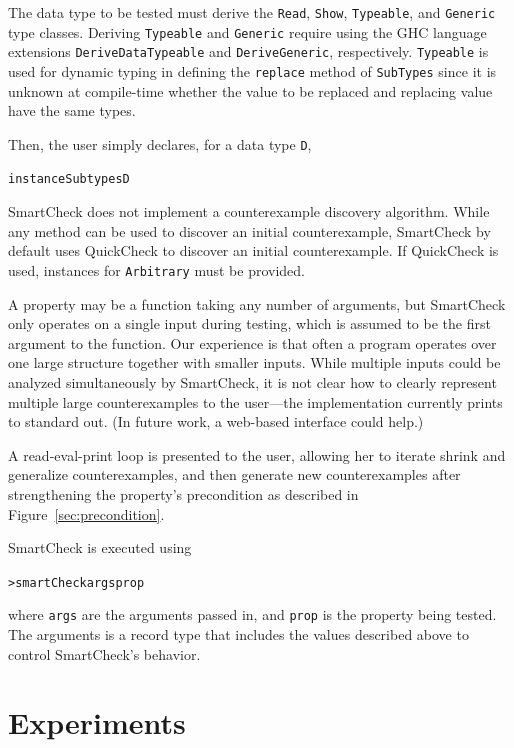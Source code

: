 \documentclass[10pt]{sigplanconf}
\newenvironment{code}{\begin{alltt}}{\end{alltt}}
\newcommand{\ttp}[1]{\texttt{#1}}
\begin{document}
The data type to be tested must derive the \ttp{Read}, \ttp{Show},
\ttp{Typeable}, and \ttp{Generic} type classes.  Deriving \ttp{Typeable} and
\ttp{Generic} require using the GHC language extensions \ttp{DeriveDataTypeable}
and \ttp{DeriveGeneric}, respectively.  \ttp{Typeable} is used for dynamic
typing in defining the \ttp{replace} method of \ttp{SubTypes} since it is
unknown at compile-time whether the value to be replaced and replacing value
have the same types.

Then, the user simply declares, for a data type \ttp{D},
%
\begin{code}
instance Subtypes D
\end{code}
%

SmartCheck does not implement a counterexample discovery algorithm.  While any
method can be used to discover an initial counterexample, SmartCheck by default
uses QuickCheck to discover an initial counterexample.  If QuickCheck is used,
instances for \ttp{Arbitrary} must be provided.

A property may be a function taking any number of arguments, but SmartCheck only
operates on a single input during testing, which is assumed to be the first
argument to the function.  Our experience is that often a program operates over
one large structure together with smaller inputs.  While multiple inputs could
be analyzed simultaneously by SmartCheck, it is not clear how to clearly
represent multiple large counterexamples to the user---the implementation
currently prints to standard out.  (In future work, a web-based interface could help.)

A read-eval-print loop is presented to the user, allowing her to iterate shrink
and generalize counterexamples, and then generate new counterexamples after
strengthening the property's precondition as described in
Figure~\ref{sec:precondition}.

SmartCheck is executed using
%
\begin{code}
> smartCheck args prop
\end{code}
%
\noindent
where \ttp{args} are the arguments passed in, and \ttp{prop} is the property
being tested.  The arguments is a record type that includes the values described
above to control SmartCheck's behavior.


\section{Experiments}\label{sec:experiments}
\end{document}

